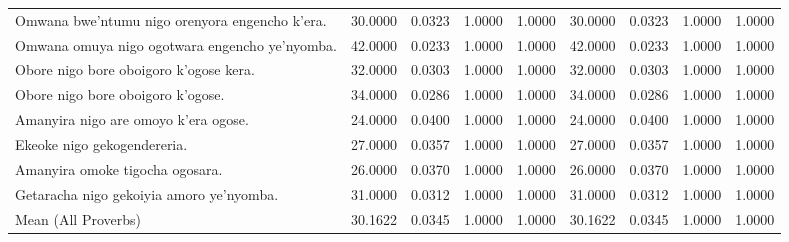 \begin{table}
\begin{tabular}{lrrrrrrrr}
        Omwana bwe'ntumu nigo orenyora engencho k'era.       & 30.0000                                 & 0.0323                                  & 1.0000 & 1.0000 & 30.0000   & 0.0323   & 1.0000 & 1.0000 \\
        Omwana omuya nigo ogotwara engencho ye'nyomba.       & 42.0000                                 & 0.0233                                  & 1.0000 & 1.0000 & 42.0000   & 0.0233   & 1.0000 & 1.0000 \\
        Obore nigo bore oboigoro k'ogose kera.               & 32.0000                                 & 0.0303                                  & 1.0000 & 1.0000 & 32.0000   & 0.0303   & 1.0000 & 1.0000 \\
        Obore nigo bore oboigoro k’ogose.                    & 34.0000                                 & 0.0286                                  & 1.0000 & 1.0000 & 34.0000   & 0.0286   & 1.0000 & 1.0000 \\
        Amanyira nigo are omoyo k’era ogose.                 & 24.0000                                 & 0.0400                                  & 1.0000 & 1.0000 & 24.0000   & 0.0400   & 1.0000 & 1.0000 \\
        Ekeoke nigo gekogendereria.                          & 27.0000                                 & 0.0357                                  & 1.0000 & 1.0000 & 27.0000   & 0.0357   & 1.0000 & 1.0000 \\
        Amanyira omoke tigocha ogosara.                      & 26.0000                                 & 0.0370                                  & 1.0000 & 1.0000 & 26.0000   & 0.0370   & 1.0000 & 1.0000 \\
        Getaracha nigo gekoiyia amoro ye'nyomba.             & 31.0000                                 & 0.0312                                  & 1.0000 & 1.0000 & 31.0000   & 0.0312   & 1.0000 & 1.0000 \\
        Mean (All Proverbs)                                  & 30.1622                                 & 0.0345                                  & 1.0000 & 1.0000 & 30.1622   & 0.0345   & 1.0000 & 1.0000 \\
        \bottomrule
    \end{tabular}
\end{table}